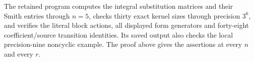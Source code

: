 The retained program
computes the integral substitution matrices and their Smith
entries through \(n=5\), checks thirty exact kernel sizes
through precision \(3^6\), and verifies the literal block
actions, all displayed form generators and forty-eight
coefficient/source transition identities.
Its saved output also checks the local precision-nine
noncyclic example.  The proof above gives the assertions
at every \(n\) and every \(r\).
